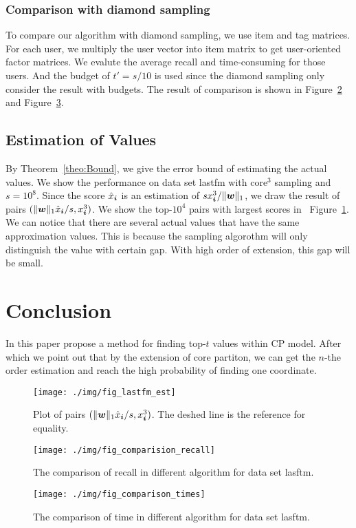 \documentclass[letterpaper]{article}
\newcommand{\V}[1]{{\boldsymbol{{\MakeLowercase{#1}}}}}
\newcommand{\norm}[2]{\|#1\|_{#2}}
\newcommand{\Fig}[1]   {Figure~\ref{fig:#1}}
\newcommand{\Theo}[1] {Theorem~\ref{theo:#1}}
\begin{document}
\subsubsection{Comparison with diamond sampling}
To compare our algorithm with diamond sampling, we use item and tag matrices.
For each user, we multiply the user vector into item matrix
to get user-oriented factor matrices.
We evalute the average recall and time-consuming for those users.
And the budget of $t'=s/10$ is used since the diamond sampling only consider the result with budgets.
The result of comparison is shown in \Fig{Comparison_recall} and \Fig{Comparison_time}.

\subsection{Estimation of Values}
By \Theo{Bound}, we give the error bound of estimating the actual values.
We show the performance on data set lastfm with core$^3$ sampling and $s=10^8$.
Since the score $\hat{x}_{\V{i}}$ is an estimation of $sx^3_{\V{i}}/\norm{\V{w}}{1}$,
we draw the result of pairs $(\norm{\V{w}}{1}\hat{x}_{\V{i}}/s,x^3_{\V{i}})$.
We show the top-$10^4$ pairs with largest scores in ~\Fig{Est}.
We can notice that there are several actual values that have the same approximation values.
This is because the sampling algorothm will only distinguish the value with certain gap.
With high order of extension, this gap will be small. 
\section{Conclusion}
In this paper propose a method for finding top-$t$ values within CP model.
After which we point out that by the extension of core partiton, 
we can get the $n$-the order estimation and reach the high probability of finding one coordinate.
\begin{figure}[t]
  \centering
  \texttt{[image: ./img/fig\_lastfm\_est]}\\
  \caption{Plot of pairs $(\norm{\V{w}}{1}\hat{x}_{\V{i}}/s,x^3_{\V{i}})$.
          The deshed line is the reference for equality.}
  \label{fig:Est}
\end{figure}

\begin{figure}[t]
  \centering
  \texttt{[image: ./img/fig\_comparision\_recall]}\\
  \caption{The comparison of recall in different algorithm for data set lasftm.}
  \label{fig:Comparison_recall}
\end{figure}

\begin{figure}[H]
    \centering
    \texttt{[image: ./img/fig\_comparison\_times]}\\
    \caption{The comparison of time in different algorithm for data set lasftm.}
\label{fig:Comparison_time}
\end{figure}




\end{document}
